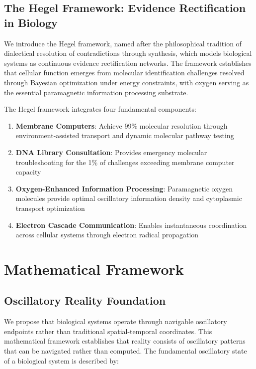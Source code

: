 \documentclass[12pt,a4paper]{article}
\begin{document}
\subsection{The Hegel Framework: Evidence Rectification in Biology}

We introduce the Hegel framework, named after the philosophical tradition of dialectical resolution of contradictions through synthesis, which models biological systems as continuous evidence rectification networks. The framework establishes that cellular function emerges from molecular identification challenges resolved through Bayesian optimization under energy constraints, with oxygen serving as the essential paramagnetic information processing substrate.

The Hegel framework integrates four fundamental components:

\begin{enumerate}
\item \textbf{Membrane Computers}: Achieve 99\% molecular resolution through environment-assisted transport and dynamic molecular pathway testing
\item \textbf{DNA Library Consultation}: Provides emergency molecular troubleshooting for the 1\% of challenges exceeding membrane computer capacity
\item \textbf{Oxygen-Enhanced Information Processing}: Paramagnetic oxygen molecules provide optimal oscillatory information density and cytoplasmic transport optimization
\item \textbf{Electron Cascade Communication}: Enables instantaneous coordination across cellular systems through electron radical propagation
\end{enumerate}

\section{Mathematical Framework}

\subsection{Oscillatory Reality Foundation}

We propose that biological systems operate through navigable oscillatory endpoints rather than traditional spatial-temporal coordinates. This mathematical framework establishes that reality consists of oscillatory patterns that can be navigated rather than computed. The fundamental oscillatory state of a biological system is described by:
\end{document}
